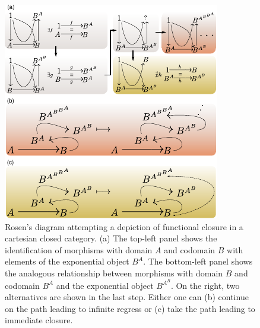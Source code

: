 \begin{figure}
\begin{center}
\noindent\includegraphics[width=0.75\columnwidth]{fig/mrcatclosure.pdf}
\end{center}
\caption{Rosen's diagram attempting a depiction of functional closure in a cartesian closed category. (a) The top-left panel shows the identification of morphisms with domain $A$ and codomain $B$ with elements of the exponential object $B^A$. The bottom-left panel shows the analogous relationship between morphisms with domain $B$ and codomain $B^A$ and the exponential object $B^{A^B}$. On the right, two alternatives are shown in the last step. Either one can (b) continue on the path leading to infinite regress or (c) take the path leading to immediate closure.}
\label{fig:hom}
\end{figure}

